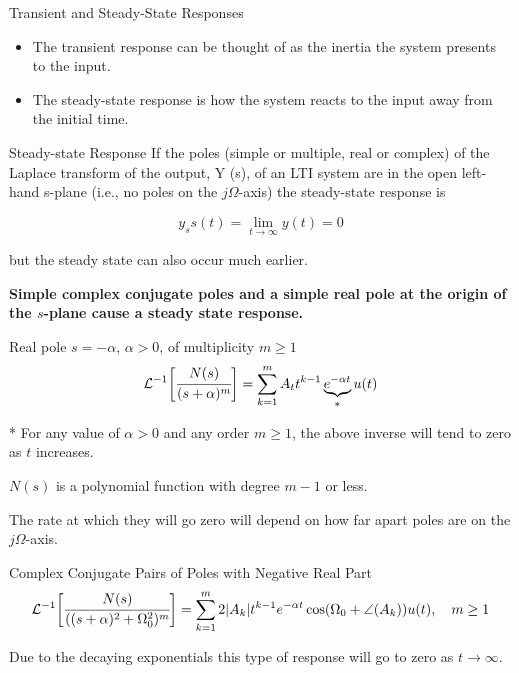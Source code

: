 \documentclass[aspectratio=169,xcolor=dvipsnames,svgnames,x11names,fleqn]{beamer}
\begin{document}
\begin{frame}{Transient and Steady-State Responses}
    \begin{itemize}
        \item The transient response can be thought of as the inertia the system presents to the input.
\item The steady-state response is how the system reacts to the input away from the initial time.


    \end{itemize}
\end{frame}


\begin{frame}{Steady-state Response}
    If the poles (simple or multiple, real or complex) of the Laplace transform of the output, Y (s), of an LTI system are in the open left-hand s-plane (i.e., no poles on the $j\Omega$-axis) the steady-state response is

    $$
    y_ss(t) = \lim_{t \to \infty } y(t) = 0
    $$

    but the steady state can also occur much earlier.

\vspace{10pt}

    \bf \color{red}
Simple complex conjugate poles and a simple real pole at the origin of the $s$-plane cause a steady state response.

    
\end{frame}


\begin{frame}{Real pole $s = -\alpha$, $\alpha > 0$, of multiplicity $m \geq 1$}
$$
{\mathcal L}^{-1}\bigg[ \cfrac{N(s)}{(s+ \alpha)^m  }  \bigg] = \sum_{k=1}^m A_t t^{k-1}\underbrace{e^{-\alpha t}}_{*} u(t)
$$

* For any value of $ \alpha > 0$ and any order $m \geq 1$, the above inverse will tend to zero as $t$ increases.    

$N(s)$ is a polynomial function with degree $m - 1$ or less.

The rate at which they will go zero will depend on how far apart poles are on the $ j\Omega$-axis.

\end{frame}


\begin{frame}{Complex Conjugate Pairs of Poles with Negative Real Part}
$$
{\mathcal L}^{-1}\bigg [  \cfrac{N(s)}{( ( s+ \alpha)^2 + \Omega_0^2 )^m}  \bigg] = \sum_{ k=1}^m 2 | A_k | t^{k-1}e ^{   -\alpha t} \cos (\Omega_0 + \angle (A_k) ) u(t), \quad m \geq 1
$$    

Due to the decaying exponentials this type of response will go to zero as $t\to \infty $.

\end{frame}
\end{document}
